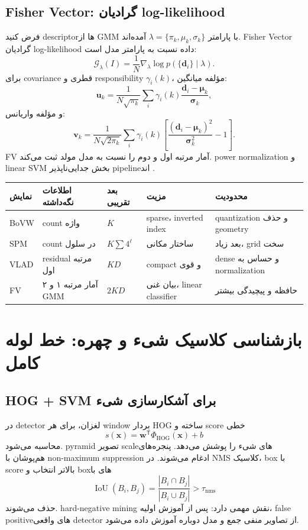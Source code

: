 \documentclass[12pt,openany,oneside]{book}
\newcommand{\trans}{^{\mathsf T}}
\newcommand{\vect}[1]{\bm{#1}}
\newcommand{\IoU}{\operatorname{IoU}}
\begin{document}
\subsection{Fisher Vector: گرادیان log-likelihood}
فرض کنید descriptorها از GMM با پارامتر $\lambda=\{\pi_k,\mu_k,\sigma_k\}$ آمده‌اند. Fisher Vector گرادیان log-likelihood داده نسبت به پارامتر مدل است:
\begin{equation}
\mathcal G_\lambda(I)=\frac1N\nabla_\lambda\log p(\{\vect d_i\}\mid\lambda).
\end{equation}
برای covariance قطری و responsibility $\gamma_i(k)$، مؤلفه میانگین:
\begin{equation}
\vect u_k=\frac{1}{N\sqrt{\pi_k}}
\sum_i\gamma_i(k)\frac{\vect d_i-\vect\mu_k}{\vect\sigma_k},
\end{equation}
و مؤلفه واریانس:
\begin{equation}
\vect v_k=\frac{1}{N\sqrt{2\pi_k}}
\sum_i\gamma_i(k)
\left[\frac{(\vect d_i-\vect\mu_k)^2}{\vect\sigma_k^2}-1\right].
\end{equation}
FV آمار مرتبه اول و دوم را نسبت به مدل مولد ثبت می‌کند. power normalization و linear SVM بخش جدایی‌ناپذیر pipeline‌اند \cite{perronnin2010,sanchez2013}.

\begin{longtable}{p{24mm}p{31mm}p{29mm}p{29mm}p{25mm}}
\toprule
نمایش & اطلاعات نگه‌داشته & بعد تقریبی & مزیت & محدودیت \\
\midrule
BoVW & count واژه & $K$ & sparse، inverted index & quantization و حذف geometry \\
SPM & count در سلول & $K\sum4^\ell$ & ساختار مکانی & بعد زیاد، grid سخت \\
VLAD & residual مرتبه اول & $KD$ & compact و قوی & dense و حساس به normalization \\
FV & آمار مرتبه ۱ و ۲ GMM & $2KD$ & بیان غنی، linear classifier & حافظه و پیچیدگی بیشتر \\
\bottomrule
\end{longtable}

\section{بازشناسی کلاسیک شیء و چهره: خط لوله کامل}
\subsection{HOG + SVM برای آشکارسازی شیء}
در detector لغزان، برای هر window بردار HOG ساخته و score خطی
\begin{equation}
s(\vect x)=\vect w\trans\Phi_{\mathrm{HOG}}(\vect x)+b
\end{equation}
محاسبه می‌شود. pyramid تصویر scaleهای شیء را پوشش می‌دهد. پنجره‌های هم‌پوشان با non-maximum suppression ادغام می‌شوند. در NMS کلاسیک، box با score بالاتر انتخاب و boxهای با
\begin{equation}
\IoU(B_i,B_j)=\frac{|B_i\cap B_j|}{|B_i\cup B_j|}>\tau_{\mathrm{nms}}
\end{equation}
حذف می‌شوند. hard-negative mining نقش مهمی دارد: پس از آموزش اولیه، false positiveهای واقعی detector از تصاویر منفی جمع و مدل دوباره آموزش داده می‌شود.
\end{document}
